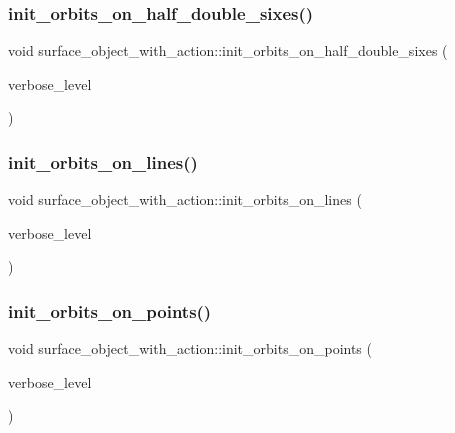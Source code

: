 \subsubsection{\texorpdfstring{init\+\_\+orbits\+\_\+on\+\_\+half\+\_\+double\+\_\+sixes()}{init\_orbits\_on\_half\_double\_sixes()}}
{\footnotesize\ttfamily void surface\+\_\+object\+\_\+with\+\_\+action\+::init\+\_\+orbits\+\_\+on\+\_\+half\+\_\+double\+\_\+sixes (\begin{DoxyParamCaption}\item[{\mbox{\hyperlink{galois_8h_a09fddde158a3a20bd2dcadb609de11dc}{I\+NT}}}]{verbose\+\_\+level }\end{DoxyParamCaption})}

\mbox{\label{classsurface__object__with__action_a774d7cd436a671bafdf364400a233db5}} 
\subsubsection{\texorpdfstring{init\+\_\+orbits\+\_\+on\+\_\+lines()}{init\_orbits\_on\_lines()}}
{\footnotesize\ttfamily void surface\+\_\+object\+\_\+with\+\_\+action\+::init\+\_\+orbits\+\_\+on\+\_\+lines (\begin{DoxyParamCaption}\item[{\mbox{\hyperlink{galois_8h_a09fddde158a3a20bd2dcadb609de11dc}{I\+NT}}}]{verbose\+\_\+level }\end{DoxyParamCaption})}

\mbox{\label{classsurface__object__with__action_af409fc1a4a148cb138ceac1bdedf3d8a}} 
\subsubsection{\texorpdfstring{init\+\_\+orbits\+\_\+on\+\_\+points()}{init\_orbits\_on\_points()}}
{\footnotesize\ttfamily void surface\+\_\+object\+\_\+with\+\_\+action\+::init\+\_\+orbits\+\_\+on\+\_\+points (\begin{DoxyParamCaption}\item[{\mbox{\hyperlink{galois_8h_a09fddde158a3a20bd2dcadb609de11dc}{I\+NT}}}]{verbose\+\_\+level }\end{DoxyParamCaption})}

